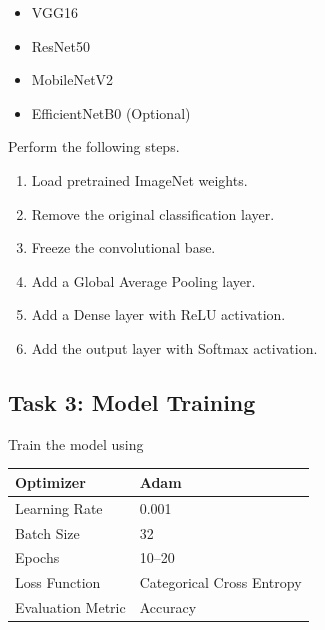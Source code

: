 \documentclass[11pt]{article}
\begin{document}
\begin{itemize}

\item VGG16

\item ResNet50

\item MobileNetV2

\item EfficientNetB0 (Optional)

\end{itemize}

Perform the following steps.

\begin{enumerate}

\item Load pretrained ImageNet weights.

\item Remove the original classification layer.

\item Freeze the convolutional base.

\item Add a Global Average Pooling layer.

\item Add a Dense layer with ReLU activation.

\item Add the output layer with Softmax activation.

\end{enumerate}

\subsection*{Task 3: Model Training}

Train the model using

\begin{center}

\begin{tabular}{|p{5cm}|p{6cm}|}

\hline

Optimizer & Adam\\

\hline

Learning Rate & 0.001\\

\hline

Batch Size & 32\\

\hline

Epochs & 10--20\\

\hline

Loss Function &
Categorical Cross Entropy\\

\hline

Evaluation Metric &
Accuracy\\

\hline

\end{tabular}

\end{center}
\end{document}
